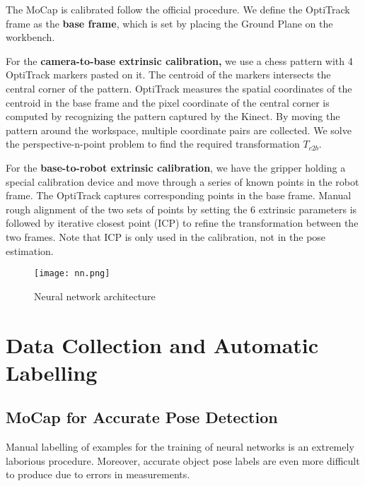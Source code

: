 \documentclass[conference]{IEEEtran}
\begin{document}


The MoCap is calibrated follow the official procedure. We define the OptiTrack frame as the \textbf{base frame}, which is set by placing the Ground Plane on the workbench.

For the \textbf{camera-to-base extrinsic calibration,} we use a chess pattern with 4 OptiTrack markers pasted on it. The centroid of the markers intersects the central corner of the pattern. OptiTrack measures the spatial coordinates of the centroid in the base frame and the pixel coordinate of the central corner is computed by recognizing the pattern captured by the Kinect. By moving the pattern around the workspace, multiple coordinate pairs are collected. We solve the perspective-n-point problem to find the required transformation $T_{c2b}$.

For the \textbf{base-to-robot extrinsic calibration}, we have the gripper holding a special calibration device and move through a series of known points in the robot frame. The OptiTrack captures corresponding points in the base frame. Manual rough alignment of the two sets of points by setting the 6 extrinsic parameters is followed by iterative closest point (ICP) to refine the transformation between the two frames. Note that ICP is only used in the calibration, not in the pose estimation.

\begin{figure*}[h]
  \texttt{[image: nn.png]}
  \caption{Neural network architecture}
  \label{fig_nn}
\end{figure*}

\section{Data Collection and Automatic Labelling}
\subsection{MoCap for Accurate Pose Detection}
Manual labelling of examples for the training of neural networks is an extremely laborious procedure. Moreover, accurate object pose labels are even more difficult to produce due to errors in measurements.
\end{document}

